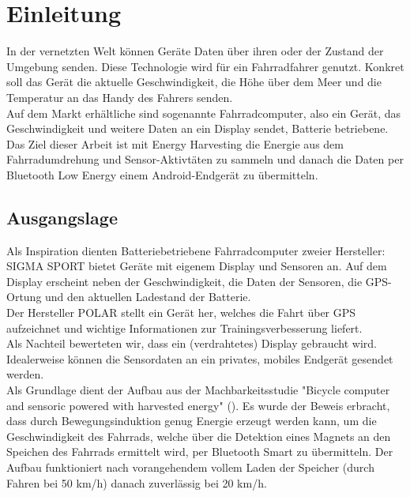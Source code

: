 \chapter{Einleitung}
In der vernetzten Welt können Geräte Daten über ihren oder der Zustand der Umgebung senden. Diese Technologie wird für ein Fahrradfahrer genutzt. Konkret soll das Gerät die aktuelle Geschwindigkeit, die Höhe über dem Meer und die Temperatur an das Handy des Fahrers senden.\\

Auf dem Markt erhältliche sind sogenannte Fahrradcomputer, also ein Gerät, das Geschwindigkeit und weitere Daten an ein Display sendet, Batterie betriebene. Das Ziel dieser Arbeit ist mit Energy Harvesting die Energie aus dem Fahrradumdrehung und Sensor-Aktivtäten zu sammeln und danach die Daten per Bluetooth Low Energy einem Android-Endgerät zu übermitteln.


\section{Ausgangslage}

Als Inspiration dienten Batteriebetriebene Fahrradcomputer zweier Hersteller:\\ 
SIGMA SPORT bietet Geräte mit eigenem Display und  Sensoren an. Auf dem Display erscheint neben der Geschwindigkeit, die Daten der Sensoren, die GPS-Ortung und den aktuellen Ladestand der Batterie.\\ 
Der Hersteller POLAR stellt ein Gerät her, welches die Fahrt über GPS aufzeichnet und wichtige Informationen zur Trainingsverbesserung liefert.\\
Als Nachteil bewerteten wir, dass ein (verdrahtetes) Display gebraucht wird. Idealerweise können die Sensordaten an ein privates, mobiles Endgerät gesendet werden.\\


Als Grundlage dient der Aufbau aus der Machbarkeitsstudie "Bicycle computer and sensoric powered with harvested energy" (\cite{PA_bicycle}). Es wurde der Beweis erbracht, dass durch Bewegungsinduktion genug Energie erzeugt werden kann, um die Geschwindigkeit des Fahrrads, welche über die Detektion eines Magnets an den Speichen des Fahrrads ermittelt wird, per Bluetooth Smart zu übermitteln. Der Aufbau funktioniert nach vorangehendem vollem Laden der Speicher (durch Fahren bei 50 km/h) danach zuverlässig bei 20 km/h. \\


